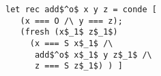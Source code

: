\begin{minipage}[t]{0.35\columnwidth}
  \begin{lstlisting}[frame=tb]
 let rec add$^o$ x y z = conde [
   (x === O /\ y === z);
   (fresh (x$_1$ z$_1$)
     (x === S x$_1$ /\
      add$^o$ x$_1$ y z$_1$ /\
      z === S z$_1$) ) ]
  \end{lstlisting}
\end{minipage}
